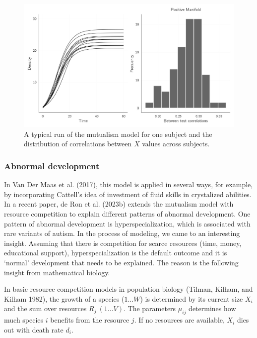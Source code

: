 \documentclass[
  a4paper,
  DIV=11,
  numbers=noendperiod,
  oneside]{scrreprt}
\begin{document}
\begin{figure}

{\centering \includegraphics{media/ch6/fig-ch6-img7-old-76.jpg}

}

\caption{\label{fig-ch6-img7-old-76}A typical run of the mutualism model
for one subject and the distribution of correlations between \(X\)
values across subjects.}

\end{figure}

\hypertarget{sec-Abnormal-development}{%
\subsubsection{Abnormal development}\label{sec-Abnormal-development}}

In Van Der Maas et al. (2017), this model is applied in several ways,
for example, by incorporating Cattell's idea of investment of fluid
skills in crystalized abilities. In a recent paper, de Ron et al.
(2023b) extends the mutualism model with resource competition to explain
different patterns of abnormal development. One pattern of abnormal
development is hyperspecialization, which is associated with rare
variants of autism. In the process of modeling, we came to an
interesting insight. Assuming that there is competition for scarce
resources (time, money, educational support), hyperspecialization is the
default outcome and it is `normal' development that needs to be
explained. The reason is the following insight from mathematical
biology.

In basic resource competition models in population biology (Tilman,
Kilham, and Kilham 1982), the growth of a species (\(1...W\)) is
determined by its current size \(X_{i}\) and the sum over resources
\(R_{j}\ (1...V)\). The parameters \(\mu_{ij}\) determines how much
species \(i\) benefits from the resource \(j\). If no resources are
available, \(X_{i}\) dies out with death rate \(d_{i}\).
\end{document}
